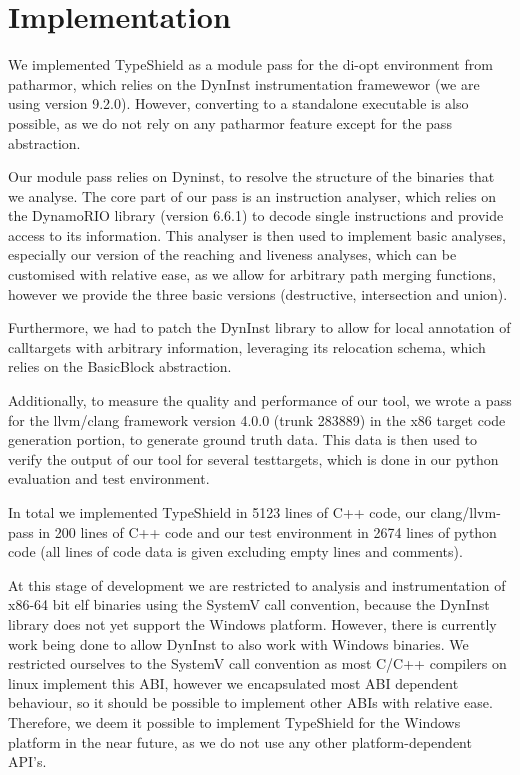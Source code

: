 \chapter{Implementation}
\label{chapter:Implementation}

We implemented TypeShield as a module pass for the di-opt environment from patharmor\cite{veen:cfi}, which relies on the DynInst \cite{bernat:dyninst} instrumentation framewewor (we are using version 9.2.0). However, converting to a standalone executable is also possible, as we do not rely on any patharmor feature except for the pass abstraction.

Our module pass relies on Dyninst, to resolve the structure of the binaries that we analyse. The core part of our pass is an instruction analyser, which relies on the DynamoRIO \cite{dynamorio:drmemory} library (version 6.6.1) to decode single instructions and provide access to its information. This analyser is then used to implement basic analyses, especially our version of the reaching and liveness analyses, which can be customised with relative ease, as we allow for arbitrary path merging functions, however we provide the three basic versions (destructive, intersection and union).

Furthermore, we had to patch the DynInst library to allow for local annotation of calltargets with arbitrary information, leveraging its relocation schema, which relies on the BasicBlock abstraction.

Additionally, to measure the quality and performance of our tool, we wrote a pass for the llvm/clang framework version 4.0.0 (trunk 283889) in the x86 target code generation portion, to generate ground truth data. This data is then used to verify the output of our tool for several testtargets, which is done in our python evaluation and test environment.

In total we implemented TypeShield in 5123 lines of C++ code, our clang/llvm-pass in 200 lines of C++ code and our test environment in 2674 lines of python code (all lines of code data is given excluding empty lines and comments).

At this stage of development we are restricted to analysis and instrumentation of x86-64 bit elf binaries using the SystemV call convention, because the DynInst library does not yet support the Windows platform. However, there is currently work being done to allow DynInst to also work with Windows binaries. We restricted ourselves to the SystemV call convention as most C/C++ compilers on linux implement this ABI, however we encapsulated most ABI dependent behaviour, so it should be possible to implement other ABIs with relative ease. Therefore, we deem it possible to implement TypeShield for the Windows platform in the near future, as we do not use any other platform-dependent API's. 

